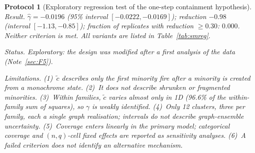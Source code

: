 \documentclass[pdflatex,sn-mathphys-num]{sn-jnl}
\newcommand{\GamPt}{-0.0196}
\newcommand{\GamLo}{-0.0222}
\newcommand{\GamHi}{-0.0169}
\newcommand{\RedPt}{-0.98}
\newcommand{\RedLo}{-1.13}
\newcommand{\RedHi}{-0.85}
\newcommand{\RedAcc}{0.000}
\newcommand{\WithinShareOneD}{96.6}
\theoremstyle{thmstyleone}%
\theoremstyle{thmstylethree}%
\newtheorem{protocol}[theorem]{Protocol}
\theoremstyle{thmstyletwo}%
\newcommand{\ctil}{\tilde{c}}
\begin{document}
\begin{protocol}[Exploratory regression test of the one-step containment hypothesis]
\emph{Result.} $\hat\gamma=\GamPt$ (95\% interval $[\GamLo,\GamHi]$);
reduction $\RedPt$ (interval $[\RedLo,\RedHi]$); fraction of replicates
with reduction $\ge0.30$: $\RedAcc$. Neither criterion is met. All
variants are listed in Table~\ref{tab:smreg}.

\emph{Status.} Exploratory: the design was modified after a first
analysis of the data (Note~\ref{sec:F5}).

\emph{Limitations.} (1)~$\ctil$ describes only the first minority fire
after a minority is created from a monochrome state. (2)~It does not
describe shrunken or fragmented minorities. (3)~Within families, $\ctil$
varies almost only in 1D (\WithinShareOneD\% of the within-family sum of
squares), so $\gamma$ is weakly identified. (4)~Only 12 clusters, three
per family, each a single graph realisation; intervals do not describe
graph-ensemble uncertainty. (5)~Coverage enters linearly in the primary
model; categorical coverage and $(n,q)$-cell fixed effects are reported as
sensitivity analyses. (6)~A failed criterion does not identify an
alternative mechanism.
\end{protocol}
\end{document}
